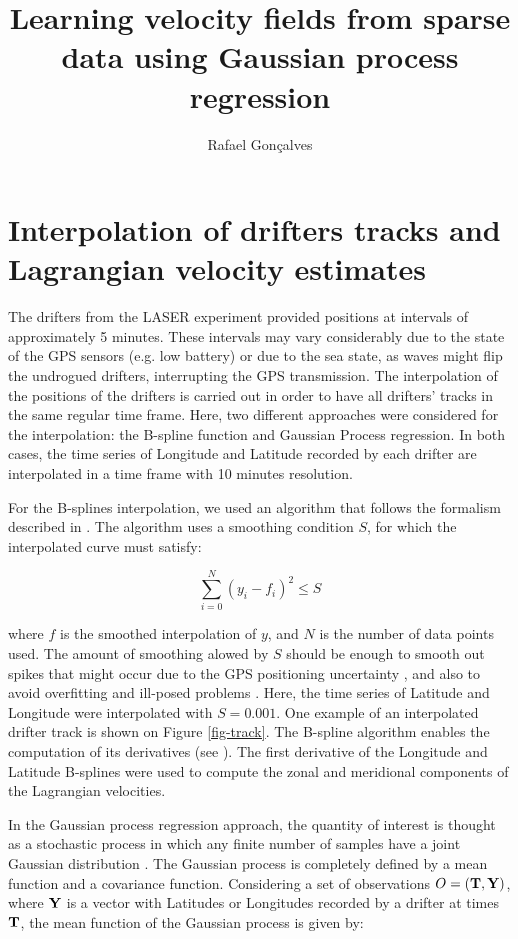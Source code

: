 \documentclass[12pt,a4paper]{article}%
\title{Learning velocity fields from sparse data using Gaussian process regression}
\author{Rafael Gon\c{c}alves}
\begin{document}
\section{Interpolation of drifters tracks and Lagrangian velocity estimates}

The drifters from the LASER experiment provided positions at intervals of approximately 5 minutes. 
These intervals may vary considerably due to the state of the GPS sensors (e.g. low battery) or due to 
the sea state, as waves might flip the undrogued drifters, interrupting the GPS transmission.
The interpolation of the positions of the drifters is carried out in order to have all drifters' tracks in 
the same regular time frame. Here, two different approaches were considered for the interpolation: the 
B-spline function and Gaussian Process regression. In both cases, the time series of Longitude and Latitude 
recorded by each drifter are interpolated in a time frame with 10 minutes resolution.

For the B-splines interpolation, we used an algorithm that follows the formalism described in 
\cite{Dierckx1975,Dierckx1981,Dierckx1982,Dierckx1993}. The algorithm uses a 
smoothing condition $S$, for which the interpolated curve must satisfy:

\begin{equation}
 \sum_{i=0}^N(y_i - f_i)^2 \le S
\end{equation}

where $f$ is the smoothed interpolation of $y$, and $N$ is the number of data points used. 
The amount of smoothing alowed by $S$ should be enough to smooth out spikes that might occur 
due to the GPS positioning uncertainty \citep{Haza20?}, and also to avoid overfitting and ill-posed 
problems \citep{Dierckx1981}. Here, the time series of Latitude and Longitude were 
interpolated with $S=0.001$. One example of an interpolated drifter track is shown on Figure \ref{fig-track}.
The B-spline algorithm enables the computation of its derivatives (see \cite{Dierckx1975}). 
The first derivative of the Longitude and Latitude B-splines were used to compute the zonal and meridional 
components of the Lagrangian velocities.

In the Gaussian process regression approach, the quantity of interest is thought as a stochastic process in which 
any finite number of samples have a joint Gaussian distribution \citep{Rasmussen2006}. The Gaussian process is completely 
defined by a mean function and a covariance function. Considering a set of observations $O=(\bf{T},\bf{Y})$, where 
$\bf{Y}$ is a vector with Latitudes or Longitudes recorded by a drifter at times $\bf{T}$, the mean function of 
the Gaussian process is given by:
\end{document}
